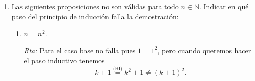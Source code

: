 \documentclass[a4paper,12pt,twoside,spanish,reqno]{amsbook}
\numberwithin{equation}{section}
\newcommand{\rta}{\noindent\textit{Rta: }}
\begin{document}
\begin{enumerate}
        \rta \textit{(Caso  base) } Para $n=0$ el resultado es verdadero pues $a_0 = 0 = 6^0 + (-1)^{1} =1 -1$.
        
        Para $n=1$ el resultado es verdadero pues $a_1 = 7 = 6^1 + (-1)^{1+1} = 6 +1$.
        
        {\it (Paso  inductivo) } Supongamos que $k \ge 1$ y el resultado  es cierto para los $h$ tales que  $1 \le h \le k$. Es decir que $a_h =6^h + (-1)^{h+1}$ para $1 \le h \le k$ y $k \ge 2$ (hipótesis inductiva), entonces debemos probar que $a_{k+1} = 6^{k+1} + (-1)^{k+2}$. Ahora bien, 
        \begin{equation*}
        \begin{matrix}\quad
        a_{k+1} &=&  5a_{k+1-1}+6a_{k+1-2} \hfill &\quad \text{(por definición recursiva)} \hfill \\[4pt]
        &=&  5a_{k}+6a_{k-1}   \hfill &\hfill\\[4pt]
        &=& 5(6^k + (-1)^{k+1})+6(6^{k-1} + (-1)^{k-1+1})  \hfill &\quad \text{(por hipótesis inductiva})\hfill \\[4pt]
        &=& 5(6^k + (-1)^{k+1})+6(6^{k-1} + (-1)^{k})  \hfill  & \hfill\\[4pt]
        &=& 5\cdot 6^k + (-1)^{k+1} 5+6 \cdot 6^{k-1} + (-1)^{k}6  \hfill  & \hfill\\[4pt]
        &=& 5\cdot 6^k + 6^k +(-1)^{k} (-1) 5 + (-1)^{k}6 \hfill  & \hfill\\[4pt]
        &=& (5 + 1)\cdot 6^k +(-1)^{k} ((-1) 5 + 6 )\hfill  & \hfill\\[4pt]
        &=& 6\cdot 6^k +(-1)^{k} \hfill  & \hfill\\[4pt]
        &=& 6^{k+1} +(-1)^{k+2}  \hfill &\quad \text{($(-1)^{k+2} = (-1)^{2}(-1)^{k}=(-1)^{k}$)}\hfill
        \end{matrix}
        \end{equation*}

            
        
        \item Las siguientes proposiciones no son válidas para todo $n \in {\mathbb N}$. Indicar en qué paso del principio de inducción falla la demostración:
            \begin{enumerate}
                \item  $n=n^2$.
                
                \rta Para el caso base no falla pues $1 = 1^2$,  pero cuando queremos hacer el paso inductivo tenemos
                \begin{equation*}
                    k+1 \overset{\text{(HI)}}{=} k^2 +1 \not=(k+1)^2.
                \end{equation*}
                

\end{enumerate}
\end{enumerate}
\end{document}
